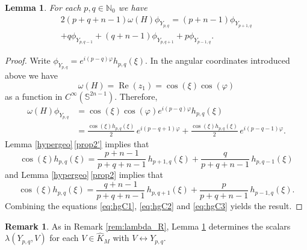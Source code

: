 \documentclass[JEP,XML,SOM,NoFloatCountersInSection,Unicode,published]{cedram}
\newtheorem{lemma}[theorem]{Lemma}
\theoremstyle{definition}
\newtheorem{remark}[theorem]{Remark}
\newcommand{\lra}{\ensuremath{\leftrightarrow}}
\newcommand{\mb}[1]{\ensuremath{\mathbb{#1}}}
\newcommand{\on}[1]{\ensuremath{\operatorname{#1}}}
\newcommand{\N}{\ensuremath{\mathbb{N}}}
\begin{document}
\begin{lemma}\label{la:decomp_omega_C}
For each $p,q\in\N_0$ we have\vspace*{-3pt}
\begin{multline*}
2(p+q+n-1)\omega(H)\phi_{Y_{p,q}}=(p+n-1)\phi_{Y_{p+1,q}}\\+q\phi_{Y_{p,q-1}}+(q+n-1)\phi_{Y_{p,q+1}}+p\phi_{Y_{p-1,q}}.
\end{multline*}
\end{lemma}

\begin{proof}
Write $\phi_{Y_{p,q}}=e^{i(p-q)\varphi}h_{p,q}(\xi)$. In the angular coordinates introduced above we have\vspace*{-3pt}
\[
\omega(H)=\on{Re}(z_1)=\cos(\xi)\cos(\varphi)
\]
as a function in $C^\infty(\mb S^{2n-1})$. Therefore,
\begin{align}
\nonumber\omega(H)\phi_{Y_{p,q}}&=\cos(\xi)\cos(\varphi)e^{i(p-q)\varphi}h_{p,q}(\xi)\\
\label{eq:hgC1}&=\frac{\cos(\xi)h_{p,q}(\xi)}{2}\,e^{i(p-q+1)\varphi}+\frac{\cos(\xi)h_{p,q}(\xi)}{2}\,e^{i(p-q-1)\varphi}.
\end{align}
Lemma \ref{hypergeo}\,\eqref{prop2'} implies that\vspace*{-3pt}
\begin{equation}
\label{eq:hgC2}\cos(\xi)h_{p,q}(\xi)=\frac{p+n-1}{p+q+n-1}\,h_{p+1,q}(\xi)+\frac{q}{p+q+n-1}\,h_{p,q-1}(\xi)
\end{equation}
and Lemma \ref{hypergeo}\,\eqref{prop2} implies that
\begin{equation}
\label{eq:hgC3}\cos(\xi)h_{p,q}(\xi)=\frac{q+n-1}{p+q+n-1}\,h_{p,q+1}(\xi)+\frac{p}{p+q+n-1}\,h_{p-1,q}(\xi).
\end{equation}
Combining the equations \eqref{eq:hgC1}, \eqref{eq:hgC2} and \eqref{eq:hgC3} yields the result.
\end{proof}

\begin{remark}\label{rem:lambda_C}
As in Remark \ref{rem:lambda_R}, Lemma \ref{la:decomp_omega_C} determines the scalars $\lambda(Y_{p,q},V)$ for each $V\in\hat K_M$ with $V\lra Y_{p,q}$.
\end{remark}
\end{document}

